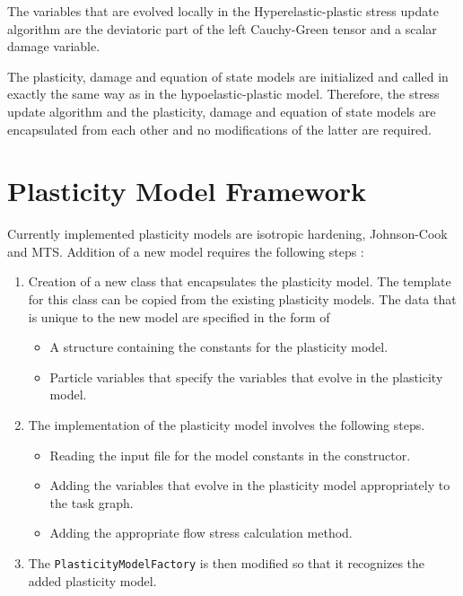 \documentclass[10pt]{article}
\begin{document}
  The variables that are evolved locally in the Hyperelastic-plastic 
  stress update algorithm are the deviatoric part of the left Cauchy-Green
  tensor and a scalar damage variable.  

  The plasticity, damage and equation of state models are initialized
  and called in exactly the same way as in the hypoelastic-plastic 
  model.  Therefore, the stress update algorithm and the plasticity,
  damage and equation of state models are encapsulated from each other
  and no modifications of the latter are required.

  \section{Plasticity Model Framework}
  Currently implemented plasticity models are isotropic hardening, 
  Johnson-Cook and MTS.  Addition of a new model requires the 
  following steps :

  \begin{enumerate}
    \item Creation of a new class that encapsulates the plasticity 
    model.  The template for this class can be copied from the
    existing plasticity models.  The data that is unique to 
    the new model are specified in the form of 
    \begin{itemize}
      \item A structure containing the constants for the plasticity
            model.
      \item Particle variables that specify the variables that 
            evolve in the plasticity model.
    \end{itemize}
    \item The implementation of the plasticity model involves the
    following steps.
    \begin{itemize}
      \item Reading the input file for the model constants in the
            constructor.
      \item Adding the variables that evolve in the plasticity model
            appropriately to the task graph.
      \item Adding the appropriate flow stress calculation method.
    \end{itemize}
    \item The \verb+PlasticityModelFactory+ is then modified so that
          it recognizes the added plasticity model.
  \end{enumerate}
\end{document}
